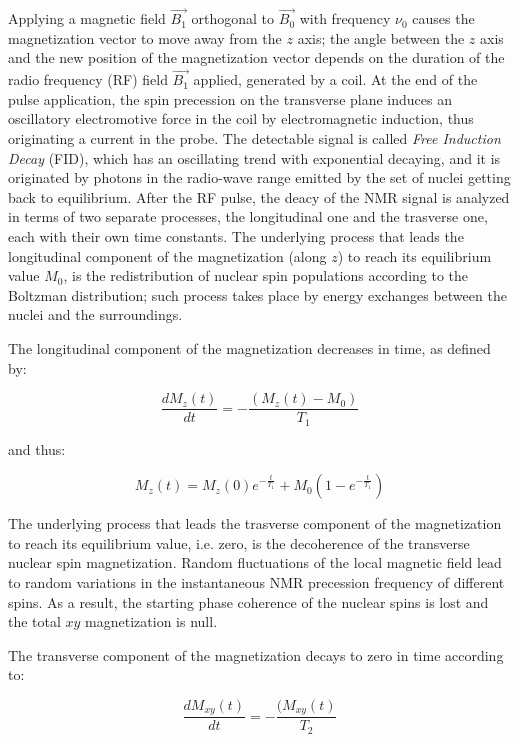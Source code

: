 \documentclass[12pt,openright,twoside,a4paper]{book}
\begin{document}
Applying a magnetic field  $\overrightarrow{B_1}$ orthogonal to  $\overrightarrow{B_0}$ with frequency $\nu_0$ causes the magnetization vector to move away from the $z$ axis; the angle between the $z$ axis and the new position of the magnetization vector depends on the duration of the radio frequency (RF)  field $\overrightarrow{B_1}$ applied, generated by a coil.
At the end of the pulse application, the spin precession on the transverse plane induces an oscillatory electromotive force in the coil by electromagnetic induction, thus originating a current in the probe.
The detectable signal is called \textit{Free Induction Decay} (FID), which has an oscillating trend with exponential decaying, and it is originated by photons in the radio-wave range emitted by the set of nuclei getting back to equilibrium.
After the RF pulse, the deacy of the NMR signal is analyzed in terms of two separate processes, the longitudinal one and the trasverse one, each with their own time constants.
The underlying process that leads the longitudinal component of the magnetization (along $z$) to reach its equilibrium value $M_0$, is the redistribution of nuclear spin populations according to the Boltzman distribution; such process takes place by energy exchanges between the nuclei and the surroundings.

The longitudinal component of the magnetization decreases in time, as defined by:

\begin{equation}
\frac{dM_z(t)}{dt}=-\frac{(M_z(t)-M_0)}{T_1}
\end{equation}

and thus:

\begin{equation}
M_z(t)=M_z(0)e^{-\frac{t}{T_1}}+ M_0(1-e^{-\frac{t}{T_1}})
\end{equation}

The underlying process that leads the trasverse component of the magnetization to reach its equilibrium value, i.e. zero, is the decoherence of the transverse nuclear spin magnetization. 
Random  fluctuations of the local magnetic  field lead to random variations in the instantaneous NMR precession frequency of different spins. 
As a result, the starting phase coherence of the nuclear spins is lost and the total $xy$ magnetization is null. 

The transverse component of the magnetization decays to zero in time according to:

\begin{equation}
\frac{dM_{xy}(t)}{dt}=-\frac{(M_{xy}(t)}{T_2}
\end{equation}
\end{document}
